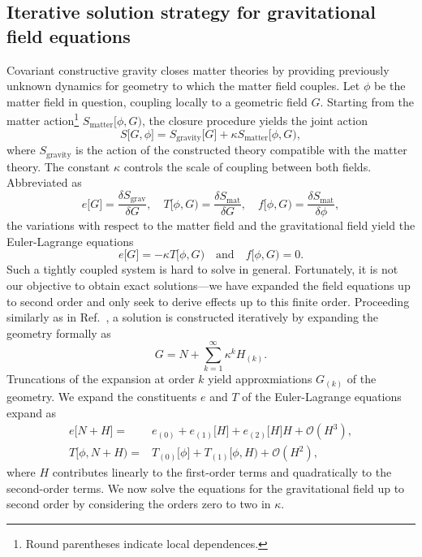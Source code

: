\subsection{Iterative solution strategy for gravitational field equations}\label{section_iterative_solution}
Covariant constructive gravity closes matter theories by providing previously unknown dynamics for geometry to which the matter field couples. Let $\phi$ be the matter field in question, coupling locally to a geometric field $G$. Starting from the matter action\footnote{Round parentheses indicate local dependences.} $S_\text{matter}\lbrack\phi, G)$, the closure procedure yields the joint action
\begin{equation}
  S\lbrack G,\phi\rbrack = S_\text{gravity}\lbrack G\rbrack + \kappa S_\text{matter}\lbrack\phi, G),
\end{equation}
where $S_\text{gravity}$ is the action of the constructed theory compatible with the matter theory. The constant $\kappa$ controls the scale of coupling between both fields. Abbreviated as
\begin{equation}
  e\lbrack G\rbrack = \frac{\delta S_\text{grav}}{\delta G},\quad T\lbrack\phi, G) = \frac{\delta S_\text{mat}}{\delta G},\quad f\lbrack\phi,G) = \frac{\delta S_\text{mat}}{\delta \phi},
\end{equation}
the variations with respect to the matter field and the gravitational field yield the Euler-Lagrange equations
\begin{equation}\label{coupled_euler_lagrange}
  e\lbrack G\rbrack = -\kappa T\lbrack\phi, G)\quad\text{and}\quad f\lbrack\phi,G) = 0.
\end{equation}
Such a tightly coupled system is hard to solve in general. Fortunately, it is not our objective to obtain exact solutions---we have expanded the field equations up to second order and only seek to derive effects up to this finite order. Proceeding similarly as in Ref.\ \cite{poisson2014gravity}, a solution is constructed iteratively by expanding the geometry formally as
\begin{equation}
  G = N + \sum_{k=1}^\infty\kappa^k H_{(k)}.
\end{equation}
Truncations of the expansion at order $k$ yield approxmiations $G_{(k)}$ of the geometry. We expand the constituents $e$ and $T$ of the Euler-Lagrange equations expand as
\begin{equation}
  \begin{aligned}
    e\lbrack N + H\rbrack = {} & e_{(0)} + e_{(1)}\lbrack H\rbrack + e_{(2)}\lbrack H\rbrack H + \mathcal O(H^3), \\
    T\lbrack\phi, N + H) = {} & T_{(0)}\lbrack\phi\rbrack + T_{(1)}\lbrack\phi,H) + \mathcal O(H^2),
  \end{aligned}
\end{equation}
where $H$ contributes linearly to the first-order terms and quadratically to the second-order terms. We now solve the equations for the gravitational field up to second order by considering the orders zero to two in $\kappa$.

